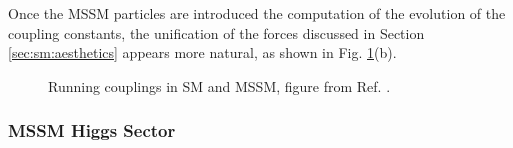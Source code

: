 Once the MSSM particles are introduced the computation of the evolution of the coupling constants, the unification of the forces discussed in Section \ref{sec:sm:aesthetics} appears more natural, as shown in Fig. \ref{fig:susy:gut}(b).

\begin{figure}[ht]
\centering
{}
\caption{Running couplings in SM and MSSM, figure from Ref. \cite{Patrignani:2016xqp}.}
\label{fig:susy:gut}
\end{figure}

\subsubsection{MSSM Higgs Sector}
\label{sec:susy:Higgs}

